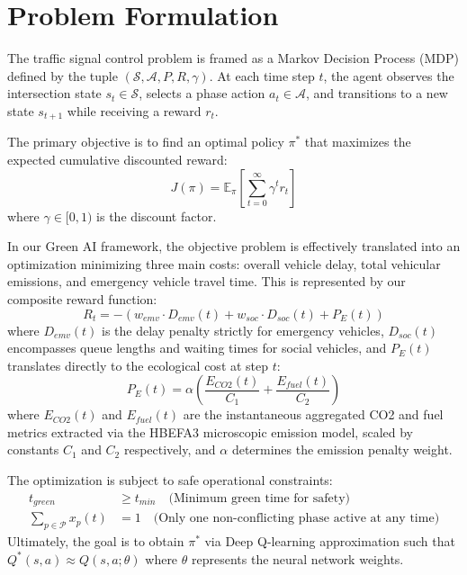 \section{Problem Formulation}
The traffic signal control problem is framed as a Markov Decision Process (MDP) defined by the tuple $(\mathcal{S}, \mathcal{A}, P, R, \gamma)$. At each time step $t$, the agent observes the intersection state $s_t \in \mathcal{S}$, selects a phase action $a_t \in \mathcal{A}$, and transitions to a new state $s_{t+1}$ while receiving a reward $r_t$.

The primary objective is to find an optimal policy $\pi^*$ that maximizes the expected cumulative discounted reward:
\begin{equation}
J(\pi) = \mathbb{E}_{\pi} \left[ \sum_{t=0}^{\infty} \gamma^t r_t \right]
\end{equation}
where $\gamma \in [0, 1)$ is the discount factor.

In our Green AI framework, the objective problem is effectively translated into an optimization minimizing three main costs: overall vehicle delay, total vehicular emissions, and emergency vehicle travel time. This is represented by our composite reward function:
\begin{equation}
R_t = - \left( w_{emv} \cdot D_{emv}(t) + w_{soc} \cdot D_{soc}(t) + P_{E}(t) \right)
\end{equation}
where $D_{emv}(t)$ is the delay penalty strictly for emergency vehicles, $D_{soc}(t)$ encompasses queue lengths and waiting times for social vehicles, and $P_{E}(t)$ translates directly to the ecological cost at step $t$:
\begin{equation}
P_E(t) = \alpha \left( \frac{E_{CO2}(t)}{C_1} + \frac{E_{fuel}(t)}{C_2} \right)
\end{equation}
where $E_{CO2}(t)$ and $E_{fuel}(t)$ are the instantaneous aggregated CO2 and fuel metrics extracted via the HBEFA3 microscopic emission model, scaled by constants $C_1$ and $C_2$ respectively, and $\alpha$ determines the emission penalty weight.

The optimization is subject to safe operational constraints:
\begin{align}
    t_{green} &\geq t_{min} \quad \text{(Minimum green time for safety)} \\
    \sum_{p \in \mathcal{P}} x_p(t) &= 1 \quad \text{(Only one non-conflicting phase active at any time)} 
\end{align}
Ultimately, the goal is to obtain $\pi^*$ via Deep Q-learning approximation such that $Q^*(s, a) \approx Q(s, a; \theta)$ where $\theta$ represents the neural network weights.